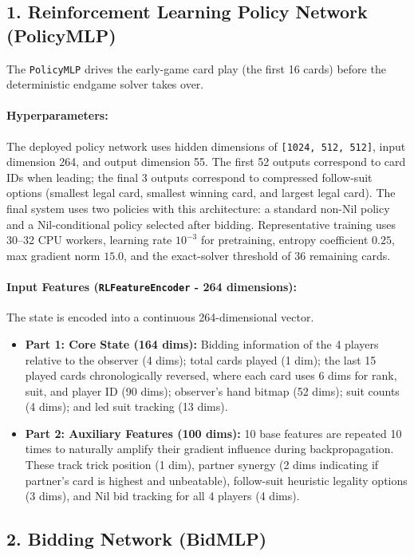\documentclass{article}
\begin{document}
\subsection{1. Reinforcement Learning Policy Network (PolicyMLP)}

The \texttt{PolicyMLP} drives the early-game card play (the first 16 cards) before the deterministic endgame solver takes over. 

\paragraph{Hyperparameters:}
The deployed policy network uses hidden dimensions of \texttt{[1024, 512, 512]}, input dimension 264, and output dimension 55. The first 52 outputs correspond to card IDs when leading; the final 3 outputs correspond to compressed follow-suit options (smallest legal card, smallest winning card, and largest legal card). The final system uses two policies with this architecture: a standard non-Nil policy and a Nil-conditional policy selected after bidding. Representative training uses 30--32 CPU workers, learning rate $10^{-3}$ for pretraining, entropy coefficient $0.25$, max gradient norm $15.0$, and the exact-solver threshold of 36 remaining cards. 

\paragraph{Input Features (\texttt{RLFeatureEncoder} - 264 dimensions):}
The state is encoded into a continuous 264-dimensional vector.
\begin{itemize}
    \item \textbf{Part 1: Core State (164 dims):} Bidding information of the 4 players relative to the observer (4 dims); total cards played (1 dim); the last 15 played cards chronologically reversed, where each card uses 6 dims for rank, suit, and player ID (90 dims); observer's hand bitmap (52 dims); suit counts (4 dims); and led suit tracking (13 dims).
    \item \textbf{Part 2: Auxiliary Features (100 dims):} 10 base features are repeated 10 times to naturally amplify their gradient influence during backpropagation. These track trick position (1 dim), partner synergy (2 dims indicating if partner's card is highest and unbeatable), follow-suit heuristic legality options (3 dims), and Nil bid tracking for all 4 players (4 dims).
\end{itemize}

\subsection{2. Bidding Network (BidMLP)}
\end{document}
